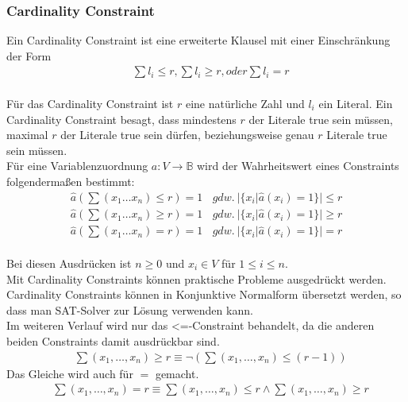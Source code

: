\documentclass[a4,abstract=on]{scrartcl}
\begin{document}
\subsubsection{Cardinality Constraint}
Ein Cardinality Constraint \cite[vgl.][]{sinz} ist eine erweiterte Klausel mit einer Einschränkung der Form 
\begin{align*}
&\sum l_i \leq r, \sum l_i \geq r, oder \sum l_i = r
\end{align*}
\ \\
Für das Cardinality Constraint ist $r$ eine natürliche Zahl und $l_i$ ein Literal. Ein Cardinality Constraint besagt, dass mindestens $r$ der Literale true sein müssen, maximal $r$ der Literale true sein dürfen, beziehungsweise genau $r$ Literale true sein müssen.\\
Für eine Variablenzuordnung $a:V \rightarrow \mathbb{B}$ wird der Wahrheitswert eines Constraints folgendermaßen bestimmt:
\begin{align*}
\hat{a} (\sum(x_1 \dots x_n ) \leq r) = 1 {~~~~} gdw. {~} |\{x_i|\hat{a} (x_i) = 1\}| \leq r \\
\hat{a} (\sum(x_1 \dots x_n ) \geq r) = 1 {~~~~} gdw. {~} |\{x_i|\hat{a} (x_i) = 1\}| \geq r \\
\hat{a} (\sum(x_1 \dots x_n ) = r) = 1 {~~~~} gdw. {~} |\{x_i|\hat{a} (x_i) = 1\}| = r 
\end{align*}
\ \\
Bei diesen Ausdrücken ist $n\geq 0$ und $x_i \in V$ für $1 \leq i \leq n$.\\
Mit Cardinality Constraints können praktische Probleme ausgedrückt werden. Cardinality Constraints können in Konjunktive Normalform übersetzt werden, so dass man SAT-Solver zur Lösung verwenden kann.\\
Im weiteren Verlauf wird nur das <=-Constraint behandelt, da die anderen beiden Constraints damit ausdrückbar sind.
\begin{align*}
&\sum (x_1, \dots, x_n) \geq r \equiv \neg (\sum (x_1, \dots, x_n) \leq (r-1))
\end{align*}
Das Gleiche wird auch für $=$ gemacht.
\begin{align*}
&\sum(x_1, \dots, x_n) = r \equiv \sum(x_1, \dots, x_n) \leq r \wedge \sum(x_1, \dots, x_n) \geq r
\end{align*}
\end{document}

